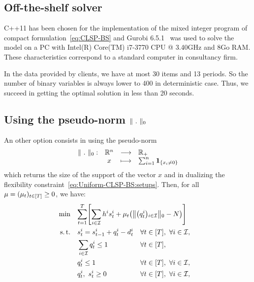 \subsection{Off-the-shelf solver}


C++11 has been chosen for the implementation of the mixed integer program of compact formulation~\eqref{eq:CLSP-BS} and Gurobi 6.5.1~\cite{gurobi} was used to solve the model on a PC with Intel(R) Core(TM) i7-3770 CPU @ 3.40GHz and 8Go RAM.
These characteristics correspond to a standard computer in consultancy firm.


In the data provided by clients, we have at most 30 items and 13 periods.
So the number of binary variables is always lower to 400 in deterministic case.
Thus, we succeed in getting the optimal solution in less than 20 seconds.


\subsection{Using the pseudo-norm $\norm{\ .\ }_0$}


An other option consists in using the pseudo-norm
\begin{equation}
\begin{array}{lccl}
  \norm{\ .\ }_0 :& \RR^n & \longrightarrow & \RR_+
  \\
  & x & \longmapsto & \sum_{i=1}^n \findi{\crbracket{x_i \ne 0}}
\end{array}
\end{equation}
which returns the size of the support of the vector $x$ and in dualizing the flexibility constraint~\eqref{eq:Uniform-CLSP-BS:setups}.
Then, for all $\mu=\bracket{\mu_t}_{t\in\range{\horizon}}\ge 0$, we have:
\begin{equation}\label{eq:Lagrangian:setups}
  \begin{aligned}
    \min\quad & \rlap{$\ds \sum_{t=1}^{\horizon} \sqbracket{ \sum_{i\in\REF} \holding^i \inventory_t^i + \mu_t \bracket{ \norm{\bracket{\quantity_t^i}_{i\in\REF}}_0 - \nbsetups} }$}
    \\
    \st\quad & \ds \inventory_t^i = \inventory_{t-1}^i + \quantity_t^i - \demand_t^i && \forall t\in\range{\horizon},\ \forall i\in\REF,
    \\
    & \ds \sum_{i\in\REF} \quantity_t^i \le 1 && \forall t\in\range{\horizon},
    \\
    & \ds \quantity_t^i \le 1 && \forall t\in\range{\horizon},\ \forall i\in\REF,
    \\
    & \ds \quantity_t^i,\ \inventory_t^i \ge 0 && \forall t\in\range{\horizon},\ \forall i\in\REF,
  \end{aligned}
\end{equation}

